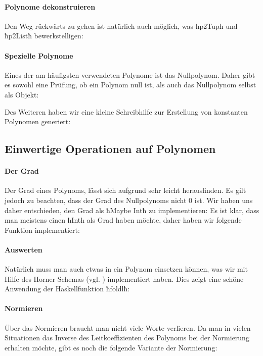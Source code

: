 \paragraph{Polynome dekonstruieren}
Den Weg rückwärts zu gehen ist natürlich auch möglich, was ħp2Tupħ und ħp2Listħ
bewerkstelligen:



\paragraph{Spezielle Polynome}
Eines der am häufigsten verwendeten Polynome ist das Nullpolynom. Daher gibt
es sowohl eine Prüfung, ob ein Polynom null ist, als auch das Nullpolynom
selbst als Objekt:


Des Weiteren haben wir eine kleine Schreibhilfe zur Erstellung von konstanten
Polynomen generiert:

\subsection{Einwertige Operationen auf Polynomen}

\paragraph{Der Grad} Der Grad eines Polynoms, lässt sich aufgrund 
 sehr leicht herausfinden. Es gilt jedoch zu beachten, dass der
Grad des Nullpolynoms nicht $0$ ist. Wir haben uns daher entschieden, den Grad
als ħMaybe Intħ zu implementieren:
Es ist klar, dass man meistens einen ħIntħ als Grad haben möchte, daher haben
wir folgende Funktion implementiert:

\paragraph{Auswerten} Natürlich muss man auch etwas in ein Polynom einsetzen
können, was wir mit Hilfe des Horner-Schemas (vgl.
\autocite{wiki:horner-schema})
implementiert haben. Dies zeigt eine schöne Anwendung der Haskellfunktion 
ħfoldlħ:


\paragraph{Normieren} Über das Normieren braucht man nicht viele Worte
verlieren.
Da man in vielen Situationen das Inverse des Leitkoeffizienten des Polynoms 
bei der Normierung erhalten möchte, gibt es noch die folgende Variante der Normierung:

